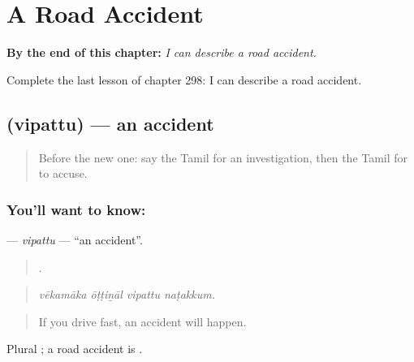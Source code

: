 
\chapter{A Road Accident}
\label{ch:ta-a-road-accident}

\begin{chapteropening}
\textbf{By the end of this chapter:} \emph{I can describe a road accident.}

Complete the last lesson of chapter 298: I can describe a road accident.
\end{chapteropening}

\section[\texorpdfstring{\ta{விபத்து} (vipattu)}{விபத்து (vipattu)}]{ (vipattu) — an accident}

\label{lesson:TA-C298-vipattu}



\begin{quote}
Before the new one: say the Tamil for an investigation, then the Tamil for to accuse.
\end{quote}

\subsection*{You'll want to know: }
\textbf{} — \emph{vipattu} — \textquotedblleft{}an accident\textquotedblright{}.

\begin{quote}
   .
\end{quote}

\begin{quote}
\emph{vēkamāka ōṭṭiṉāl vipattu naṭakkum.}
\end{quote}

\begin{quote}
If you drive fast, an accident will happen.
\end{quote}

Plural ; a road accident is  .

